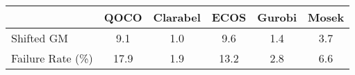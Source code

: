 \begin{tabular}{lccccc}
  \hline
   & \textbf{QOCO} & \textbf{Clarabel} & \textbf{ECOS} & \textbf{Gurobi} & \textbf{Mosek} \\ \hline
  Shifted GM & 9.1 & 1.0 & 9.6 & 1.4 & 3.7 \\ 
  Failure Rate (\%) & 17.9 & 1.9 & 13.2 & 2.8 & 6.6 \\ \hline 
\end{tabular}
